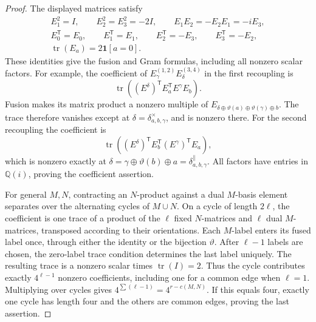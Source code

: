 \documentclass[11pt,letterpaper,onecolumn]{article}
\theoremstyle{plain}
\theoremstyle{definition}
\theoremstyle{remark}
\newcommand{\one}{\mathbf 1}
\begin{document}
\begin{proof}
The displayed matrices satisfy
\[
 \begin{gathered}
 E_1^2=I,\qquad E_2^2=E_3^2=-2I,\qquad
 E_1E_2=-E_2E_1=-iE_3,\\
 E_0^{\mathsf T}=E_0,\qquad E_1^{\mathsf T}=E_1,\qquad
 E_2^{\mathsf T}=-E_3,\qquad E_3^{\mathsf T}=-E_2,\\
 \operatorname{tr}(E_a)=2\one[a=0].
 \end{gathered}
\]
These identities give the fusion and Gram formulas, including all
nonzero scalar factors.  For example, the coefficient of
\(E_\gamma^{(1,2)}E_\delta^{(3,4)}\) in the first recoupling is
\[
 \operatorname{tr}\!\left((E^\delta)^{\mathsf T}
                  E_a^{\mathsf T}E^\gamma E_b\right).
\]
Fusion makes its matrix product a nonzero multiple of
\(E_{\delta\oplus\vartheta(a)\oplus\vartheta(\gamma)\oplus b}\).
The trace therefore vanishes except at
\(\delta=\delta^\times_{a,b,\gamma}\), and is nonzero there.
For the second recoupling the coefficient is
\[
 \operatorname{tr}\!\left((E^\delta)^{\mathsf T}
                  E_b^{\mathsf T}(E^\gamma)^{\mathsf T}E_a\right),
\]
which is nonzero exactly at
\(\delta=\gamma\oplus\vartheta(b)\oplus a
=\delta^\parallel_{a,b,\gamma}\).  All factors have entries in
\(\mathbb Q(i)\), proving the coefficient assertion.

For general \(M,N\), contracting an \(N\)-product against a dual
\(M\)-basis element separates over the alternating cycles of
\(M\cup N\).  On a cycle of length \(2\ell\), the coefficient is
one trace of a product of the \(\ell\) fixed \(N\)-matrices and
\(\ell\) dual \(M\)-matrices, transposed according to their
orientations.  Each \(M\)-label enters its fused label once, through
either the identity or the bijection \(\vartheta\).  After
\(\ell-1\) labels are chosen, the zero-label trace condition determines
the last label uniquely.  The resulting trace is a nonzero scalar times
\(\operatorname{tr}(I)=2\).  Thus the cycle contributes exactly
\(4^{\ell-1}\) nonzero coefficients, including one for a common edge
when \(\ell=1\).  Multiplying over cycles gives
\(4^{\sum(\ell-1)}=4^{r-c(M,N)}\).  If this equals four, exactly one
cycle has length four and the others are common edges, proving the last
assertion.
\end{proof}
\end{document}
